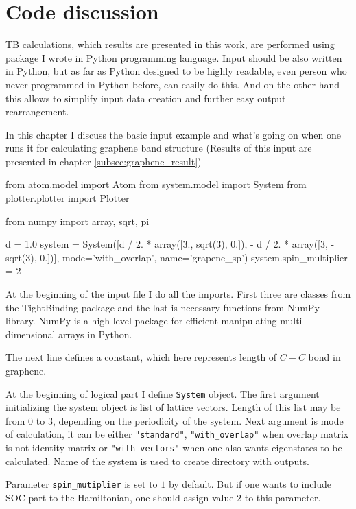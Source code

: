 \chapter{Code discussion}
TB calculations, which results are presented in this work, are performed using package I wrote in Python programming language. Input should be also written in Python, but as far as Python designed to be highly readable, even person who never programmed in Python before, can easily do this. And on the other hand this allows to simplify input data creation and further easy output rearrangement.

In this chapter I discuss the basic input example and what's going on when one runs it for calculating graphene band structure (Results of this input are presented in chapter \ref{subsec:graphene_result})

\begin{python}
from atom.model import Atom
from system.model import System
from plotter.plotter import Plotter

from numpy import array, sqrt, pi

d = 1.0
system = System([d / 2. * array([3., sqrt(3), 0.]),
                 - d / 2. * array([3, -sqrt(3), 0.])],
                mode='with_overlap', name='grapene_sp')
system.spin_multiplier = 2
\end{python}
 
At the beginning of the input file I do all the imports. First three are classes from the TightBinding package and the last is necessary functions from NumPy library. NumPy is a high-level package for efficient manipulating multi-dimensional arrays in Python. 

The next line defines a constant, which here represents length of $C-C$ bond in graphene.

At the beginning of logical part I define \verb!System! object. The first argument initializing the system object is list of lattice vectors. Length of this list may be from $0$ to $3$, depending on the periodicity of the system. Next argument is mode of calculation, it can be either \verb!"standard"!, \verb!"with_overlap"! when overlap matrix is not identity matrix or \verb!"with_vectors"! when one also wants eigenstates to be calculated. Name of the system is used to create directory with outputs.

Parameter \verb!spin_mutiplier! is set to $1$ by default. But if one wants to include SOC part to the Hamiltonian, one should assign value $2$ to this parameter.

